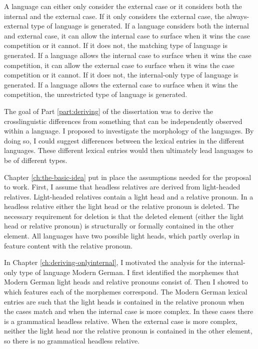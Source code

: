 A language can either only consider the external case or it considers both the internal and the external case. If it only considers the external case, the always-external type of language is generated.
If a language considers both the internal and external case, it can allow the internal case to surface when it wins the case competition or it cannot. If it does not, the matching type of language is generated.
If a language allows the internal case to surface when it wins the case competition, it can allow the external case to surface when it wins the case competition or it cannot. If it does not, the internal-only type of language is generated.
If a language allows the external case to surface when it wins the competition, the unrestricted type of language is generated.

The goal of Part \ref{part:deriving} of the dissertation was to derive the crosslinguistic differences from something that can be independently observed within a language. I proposed to investigate the morphology of the languages. By doing so, I could suggest differences between the lexical entries in the different languages. These different lexical entries would then ultimately lead languages to be of different types.

Chapter \ref{ch:the-basic-idea} put in place the assumptions needed for the proposal to work. First, I assume that headless relatives are derived from light-headed relatives. Light-headed relatives contain a light head and a relative pronoun. In a headless relative either the light head or the relative pronoun is deleted. The necessary requirement for deletion is that the deleted element (either the light head or relative pronoun) is structurally or formally contained in the other element. All languages have two possible light heads, which partly overlap in feature content with the relative pronoun.

In Chapter \ref{ch:deriving-onlyinternal}, I motivated the analysis for the internal-only type of language Modern German. I first identified the morphemes that Modern German light heads and relative pronouns consist of. Then I showed to which features each of the morphemes correspond. The Modern German lexical entries are such that the light heads is contained in the relative pronoun when the cases match and when the internal case is more complex. In these cases there is a grammatical headless relative. When the external case is more complex, neither the light head nor the relative pronoun is contained in the other element, so there is no grammatical headless relative.

